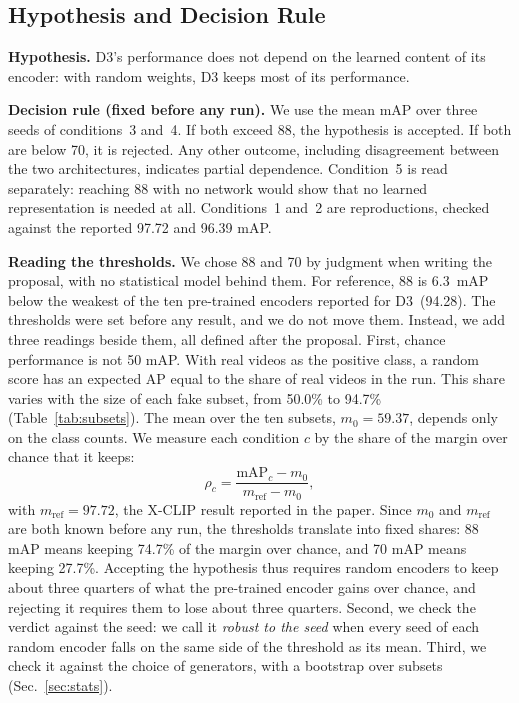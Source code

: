 \documentclass[conference]{IEEEtran}
\begin{document}
\subsection{Hypothesis and Decision Rule}
\label{sec:rule}

\textbf{Hypothesis.} D3's performance does not depend on the learned content
of its encoder: with random weights, D3 keeps most of its performance.

\textbf{Decision rule (fixed before any run).} We use the mean mAP over three
seeds of conditions~3 and~4. If both exceed 88, the hypothesis is accepted. If
both are below 70, it is rejected. Any other outcome, including disagreement
between the two architectures, indicates partial dependence. Condition~5 is
read separately: reaching 88 with no network would show that no learned
representation is needed at all. Conditions~1 and~2 are reproductions,
checked against the reported 97.72 and 96.39 mAP.

\textbf{Reading the thresholds.} We chose 88 and 70 by judgment when writing
the proposal, with no statistical model behind them. For reference, 88 is
6.3~mAP below the weakest of the ten pre-trained encoders reported for
D3~(94.28). The thresholds were set before any result, and we do not move
them. Instead, we add three readings beside them, all defined after the
proposal. First, chance
performance is not 50 mAP. With real videos as the positive class, a random
score has an expected AP equal to the share of real videos in the run. This
share varies with the size of each fake subset, from 50.0\% to 94.7\%
(Table~\ref{tab:subsets}). The mean over the ten subsets, $m_0 = 59.37$,
depends only on the class counts. We measure each condition $c$ by the share
of the margin over chance that it keeps:
\begin{equation}
  \rho_c = \frac{\mathrm{mAP}_c - m_0}{m_{\mathrm{ref}} - m_0},
\end{equation}
with $m_{\mathrm{ref}} = 97.72$, the X-CLIP result reported in the paper.
Since $m_0$ and $m_{\mathrm{ref}}$ are both known before any run, the
thresholds translate into fixed shares: 88 mAP means keeping 74.7\% of the
margin over chance, and 70 mAP means keeping 27.7\%. Accepting the hypothesis
thus requires random encoders to keep about three quarters of what the
pre-trained encoder gains over chance, and rejecting it requires them to lose
about three quarters. Second, we check the verdict against the seed: we call
it \emph{robust to the seed} when every seed of each random encoder falls on
the same side of the threshold as its mean. Third, we check it against the
choice of generators, with a bootstrap over subsets (Sec.~\ref{sec:stats}).
\end{document}

